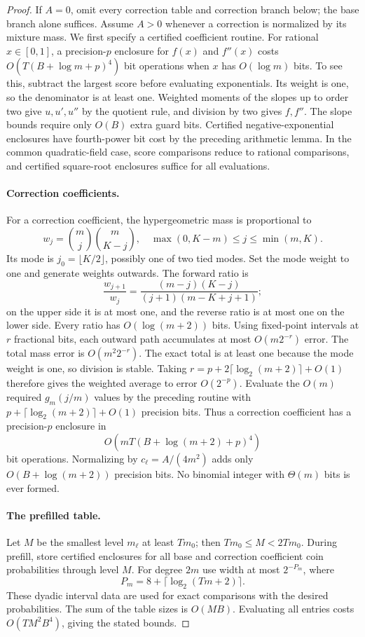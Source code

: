 \begin{proof}
If $A=0$, omit every correction table and correction branch below;
the base branch alone suffices.  Assume $A>0$ whenever a correction
is normalized by its mixture mass.
We first specify a certified coefficient routine.  For rational
$x\in[0,1]$, a precision-$p$ enclosure for $f(x)$ and $f''(x)$
costs $O(T(B+\log m+p)^4)$ bit operations when
$x$ has $O(\log m)$ bits.  To see this, subtract the largest score
before evaluating exponentials.  Its weight is one, so the
denominator is at least one.  Weighted moments of the slopes up
to order two give $u,u',u''$ by the quotient rule, and division
by two gives $f,f''$.  The slope bounds require only
$O(B)$ extra guard bits.  Certified negative-exponential enclosures
have fourth-power bit cost by the preceding arithmetic lemma.
In the common quadratic-field case, score comparisons
reduce to rational comparisons, and certified square-root
enclosures suffice for all evaluations.

\paragraph{Correction coefficients.}
For a correction coefficient, the hypergeometric mass is proportional to
\[
 w_j=\binom{m}{j}\binom{m}{K-j},
 \quad \max(0,K-m)\le j\le\min(m,K).
\]
Its mode is $j_0=\lfloor K/2\rfloor$, possibly one of two tied
modes.  Set the mode weight to one and generate weights outwards.
The forward ratio is
\[
 \frac{w_{j+1}}{w_j}
 =\frac{(m-j)(K-j)}{(j+1)(m-K+j+1)};
\]
on the upper side it is at most one, and the reverse ratio is at
most one on the lower side.  Every ratio has $O(\log(m+2))$ bits.
Using fixed-point intervals at $r$ fractional bits, each outward
path accumulates at most $O(m2^{-r})$ error.  The total mass error
is $O(m^2 2^{-r})$.  The exact total is at least one because the
mode weight is one, so division is stable.  Taking
$r=p+2\lceil\log_2(m+2)\rceil+O(1)$ therefore gives the weighted
average to error $O(2^{-p})$.  Evaluate the $O(m)$ required
$g_m(j/m)$ values by the preceding routine with
$p+\lceil\log_2(m+2)\rceil+O(1)$ precision bits.
Thus a correction
coefficient has a precision-$p$ enclosure in
\[
 O(mT(B+\log(m+2)+p)^4)
\]
bit operations.  Normalizing by $c_\ell=A/(4m^2)$ adds only
$O(B+\log(m+2))$ precision bits.  No binomial integer
with $\Theta(m)$ bits is ever formed.

\paragraph{The prefilled table.}
Let $M$ be the smallest level $m_\ell$ at least $Tm_0$; then
$Tm_0\le M<2Tm_0$.  During prefill, store certified enclosures for
all base and correction coefficient coin probabilities through
level $M$.  For degree $2m$ use width at most $2^{-P_m}$, where
\[
 P_m=8+\lceil\log_2(Tm+2)\rceil.
\]
These dyadic interval data are used for exact comparisons with the
desired probabilities.  The sum of the table sizes is
$O(MB)$.  Evaluating all entries costs
$O(TM^2B^4)$, giving the stated bounds.


\end{proof}
